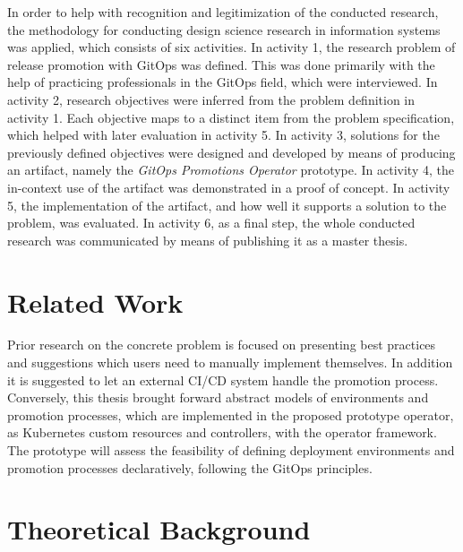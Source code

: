 In order to help with recognition and legitimization of the conducted research,
the methodology for conducting design science research in information systems
\autocite{designScienceResearchMethodologyForInformationSystemsResearch}
was applied, which consists of six activities.
In activity 1,
the research problem of
release promotion with GitOps
was defined.
This was done primarily with the help of practicing professionals in the GitOps field,
which were interviewed.
In activity 2,
research objectives were inferred from the problem definition in activity 1.
Each objective maps to a distinct item from the problem specification,
which helped with later evaluation in activity 5.
In activity 3,
solutions for the previously defined objectives were designed and developed
by means of producing an artifact, namely the \textit{GitOps Promotions Operator} prototype.
In activity 4,
the in-context use of the artifact was demonstrated in a proof of concept.
In activity 5,
the implementation of the artifact,
and how well it supports a solution to the problem,
was evaluated.
In activity 6, as a final step,
the whole conducted research was communicated by means of
publishing it as a master thesis.

\section*{Related Work}

Prior research on the concrete problem is focused on presenting
best practices and suggestions
which users need to manually implement themselves.
In addition it is suggested to let an external CI/CD system handle the promotion process.
Conversely, this thesis brought forward
abstract models of environments and promotion processes,
which are implemented in the proposed prototype operator,
as Kubernetes custom resources and controllers, with the operator framework.
The prototype will assess the feasibility of
defining deployment environments and promotion processes declaratively,
following the GitOps principles.

\section*{Theoretical Background}

